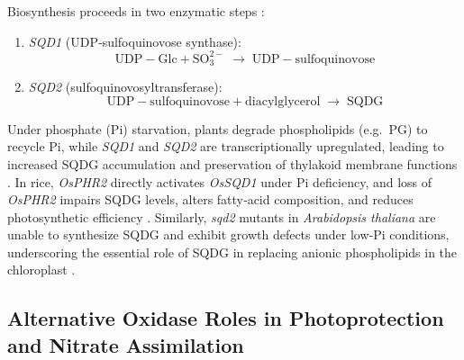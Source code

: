 \documentclass[10pt,letterpaper]{article}
\begin{document}
Biosynthesis proceeds in two enzymatic steps \citep{Yu2002,Sun2021}:
\begin{enumerate}[label=(\arabic*)]
  \item \textit{SQD1} (UDP‑sulfoquinovose synthase): 
        \[
           \mathrm{UDP\!-\!Glc} + \mathrm{SO_3^{2-}} \;\longrightarrow\; \mathrm{UDP\!-\!sulfoquinovose}
        \]
  \item \textit{SQD2} (sulfoquinovosyltransferase): 
        \[
           \mathrm{UDP\!-\!sulfoquinovose} + \mathrm{diacylglycerol} \;\longrightarrow\; \mathrm{SQDG}
        \]
\end{enumerate}

Under phosphate (Pi) starvation, plants degrade phospholipids (e.g.\ PG) to recycle Pi, while \textit{SQD1} and \textit{SQD2} are transcriptionally upregulated, leading to increased SQDG accumulation and preservation of thylakoid membrane functions \citep{Essigmann1998,Nakamura2013,Sun2021}. In rice, \textit{OsPHR2} directly activates \textit{OsSQD1} under Pi deficiency, and loss of \textit{OsPHR2} impairs SQDG levels, alters fatty‐acid composition, and reduces photosynthetic efficiency \citep{Sun2021}. Similarly, \emph{sqd2} mutants in \emph{Arabidopsis thaliana} are unable to synthesize SQDG and exhibit growth defects under low‐Pi conditions, underscoring the essential role of SQDG in replacing anionic phospholipids in the chloroplast \citep{Yu2002}.


\subsection*{Alternative Oxidase Roles in Photoprotection and Nitrate Assimilation}
\end{document}
